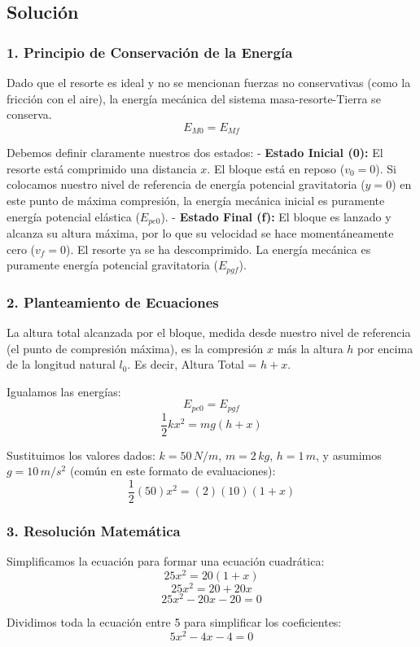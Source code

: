 \documentclass[12pt, a4paper]{article}
\begin{document}
\subsection*{Solución}

\subsubsection*{1. Principio de Conservación de la Energía}
Dado que el resorte es ideal y no se mencionan fuerzas no conservativas (como la fricción con el aire), la energía mecánica del sistema masa-resorte-Tierra se conserva.
$$ E_{M0} = E_{Mf} $$

Debemos definir claramente nuestros dos estados:
- \textbf{Estado Inicial (0):} El resorte está comprimido una distancia $x$. El bloque está en reposo ($v_0 = 0$). Si colocamos nuestro nivel de referencia de energía potencial gravitatoria ($y=0$) en este punto de máxima compresión, la energía mecánica inicial es puramente energía potencial elástica ($E_{pe0}$).
- \textbf{Estado Final (f):} El bloque es lanzado y alcanza su altura máxima, por lo que su velocidad se hace momentáneamente cero ($v_f = 0$). El resorte ya se ha descomprimido. La energía mecánica es puramente energía potencial gravitatoria ($E_{pgf}$).

\subsubsection*{2. Planteamiento de Ecuaciones}
La altura total alcanzada por el bloque, medida desde nuestro nivel de referencia (el punto de compresión máxima), es la compresión $x$ más la altura $h$ por encima de la longitud natural $l_0$. Es decir, Altura Total = $h + x$.

Igualamos las energías:
$$ E_{pe0} = E_{pgf} $$
$$ \frac{1}{2} k x^2 = m g (h + x) $$

Sustituimos los valores dados: $k = 50 \, \si{N/m}$, $m = 2 \, \si{kg}$, $h = 1 \, \si{m}$, y asumimos $g = 10 \, \si{m/s^2}$ (común en este formato de evaluaciones):
$$ \frac{1}{2} (50) x^2 = (2)(10) (1 + x) $$

\subsubsection*{3. Resolución Matemática}
Simplificamos la ecuación para formar una ecuación cuadrática:
$$ 25 x^2 = 20 (1 + x) $$
$$ 25 x^2 = 20 + 20x $$
$$ 25 x^2 - 20x - 20 = 0 $$

Dividimos toda la ecuación entre 5 para simplificar los coeficientes:
$$ 5x^2 - 4x - 4 = 0 $$
\end{document}

